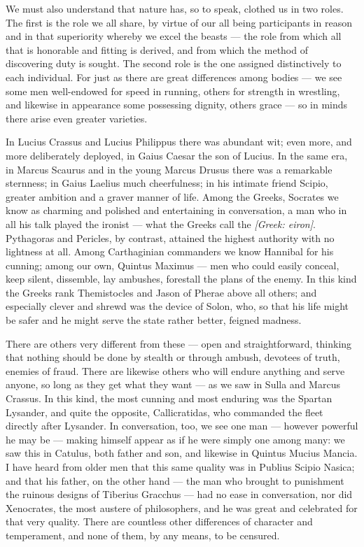  We must also understand that nature has, so to speak, clothed us in two roles. The first is the role we all share, by virtue of our all being participants in reason and in that superiority whereby we excel the beasts — the role from which all that is honorable and fitting is derived, and from which the method of discovering duty is sought. The second role is the one assigned distinctively to each individual. For just as there are great differences among bodies — we see some men well-endowed for speed in running, others for strength in wrestling, and likewise in appearance some possessing dignity, others grace — so in minds there arise even greater varieties.

 In Lucius Crassus and Lucius Philippus there was abundant wit; even more, and more deliberately deployed, in Gaius Caesar the son of Lucius. In the same era, in Marcus Scaurus and in the young Marcus Drusus there was a remarkable sternness; in Gaius Laelius much cheerfulness; in his intimate friend Scipio, greater ambition and a graver manner of life. Among the Greeks, Socrates we know as charming and polished and entertaining in conversation, a man who in all his talk played the ironist — what the Greeks call the \textit{[Greek: eiron]}. Pythagoras and Pericles, by contrast, attained the highest authority with no lightness at all. Among Carthaginian commanders we know Hannibal for his cunning; among our own, Quintus Maximus — men who could easily conceal, keep silent, dissemble, lay ambushes, forestall the plans of the enemy. In this kind the Greeks rank Themistocles and Jason of Pherae above all others; and especially clever and shrewd was the device of Solon, who, so that his life might be safer and he might serve the state rather better, feigned madness.

 There are others very different from these — open and straightforward, thinking that nothing should be done by stealth or through ambush, devotees of truth, enemies of fraud. There are likewise others who will endure anything and serve anyone, so long as they get what they want — as we saw in Sulla and Marcus Crassus. In this kind, the most cunning and most enduring was the Spartan Lysander, and quite the opposite, Callicratidas, who commanded the fleet directly after Lysander. In conversation, too, we see one man — however powerful he may be — making himself appear as if he were simply one among many: we saw this in Catulus, both father and son, and likewise in Quintus Mucius Mancia. I have heard from older men that this same quality was in Publius Scipio Nasica; and that his father, on the other hand — the man who brought to punishment the ruinous designs of Tiberius Gracchus — had no ease in conversation, nor did Xenocrates, the most austere of philosophers, and he was great and celebrated for that very quality. There are countless other differences of character and temperament, and none of them, by any means, to be censured.

